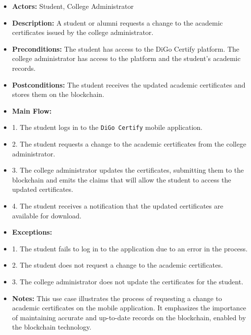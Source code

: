 \begin{itemize}

    \item \textbf{Actors:} Student, College Administrator
    \item \textbf{Description:} A student or alumni requests a change to the academic certificates issued by the college administrator.
    \item \textbf{Preconditions:} The student has access to the DiGo Certify platform. The college administrator has access to the platform and the student's academic records.
    \item \textbf{Postconditions:} The student receives the updated academic certificates and stores them on the blockchain.
    \item \textbf{Main Flow:}
    \item 1. The student logs in to the \texttt{DiGo Certify} mobile application.
    \item 2. The student requests a change to the academic certificates from the college administrator.
    \item 3. The college administrator updates the certificates, submitting them to the blockchain and emits the claims that will allow the student to access the updated certificates.
    \item 4. The student receives a notification that the updated certificates are available for download.
    \item \textbf{Exceptions:}
    \item 1. The student fails to log in to the application due to an error in the process.
    \item 2. The student does not request a change to the academic certificates.
    \item 3. The college administrator does not update the certificates for the student.
    \item \textbf{Notes:} This use case illustrates the process of requesting a change to academic certificates on the mobile application. It emphasizes the importance of maintaining accurate and up-to-date records on the blockchain, enabled by the blockchain technology.

\end{itemize}